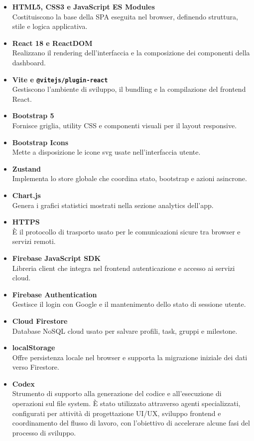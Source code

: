 \documentclass[11pt,a4paper]{article}
\begin{document}
\begin{itemize}
  \item \textbf{HTML5, CSS3 e JavaScript ES Modules}\\ Costituiscono la base della SPA eseguita nel browser, definendo struttura, stile e logica applicativa.
  \item \textbf{React 18 e ReactDOM}\\ Realizzano il rendering dell'interfaccia e la composizione dei componenti della dashboard.
  \item \textbf{Vite e \texttt{@vitejs/plugin-react}}\\ Gestiscono l'ambiente di sviluppo, il bundling e la compilazione del frontend React.
  \item \textbf{Bootstrap 5}\\ Fornisce griglia, utility CSS e componenti visuali per il layout responsive.
  \item \textbf{Bootstrap Icons}\\ Mette a disposizione le icone svg usate nell'interfaccia utente.
  \item \textbf{Zustand}\\ Implementa lo store globale che coordina stato, bootstrap e azioni asincrone.
  \item \textbf{Chart.js}\\ Genera i grafici statistici mostrati nella sezione analytics dell'app.
  \item \textbf{HTTPS}\\ È il protocollo di trasporto usato per le comunicazioni sicure tra browser e servizi remoti.
  \item \textbf{Firebase JavaScript SDK}\\ Libreria client che integra nel frontend autenticazione e accesso ai servizi cloud.
  \item \textbf{Firebase Authentication}\\ Gestisce il login con Google e il mantenimento dello stato di sessione utente.
  \item \textbf{Cloud Firestore}\\ Database NoSQL cloud usato per salvare profili, task, gruppi e milestone.
  \item \textbf{localStorage}\\ Offre persistenza locale nel browser e supporta la migrazione iniziale dei dati verso Firestore.
  \item \textbf{Codex}\\ Strumento di supporto alla generazione del codice e all’esecuzione di operazioni sul file system. È stato utilizzato attraverso agenti specializzati, configurati per attività di progettazione UI/UX, sviluppo frontend e coordinamento del flusso di lavoro, con l’obiettivo di accelerare alcune fasi del processo di sviluppo.
\end{itemize}
\newpage
\end{document}
